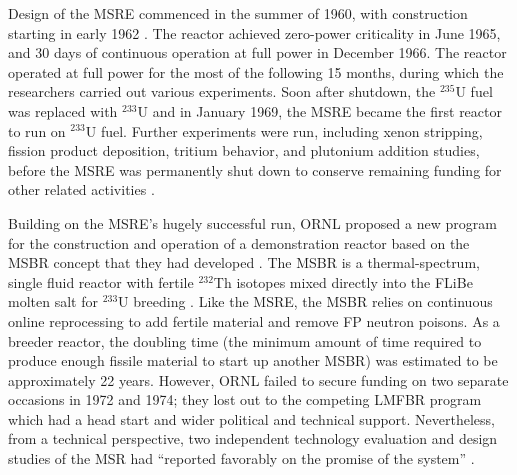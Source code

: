 Design of the \gls{MSRE} commenced in the summer of 1960, with construction
starting in early 1962 \cite{haubenreich_experience_1970}. The reactor
achieved zero-power criticality in June 1965, and 30 days of continuous
operation at full power in December 1966. The reactor operated at full power
for the most of the following 15 months, during which the researchers carried
out various experiments. Soon after shutdown, the $^{235}$U fuel was replaced
with $^{233}$U and in January 1969, the \gls{MSRE} became the first reactor to
run on $^{233}$U fuel. Further experiments were run, including xenon
stripping, fission product deposition, tritium behavior, and plutonium
addition studies, before the \gls{MSRE} was permanently shut down to conserve
remaining funding for other related activities \cite{macpherson_molten_1985}.

Building on the \gls{MSRE}'s hugely successful run, \gls{ORNL} proposed a
new program for the construction and operation of a demonstration reactor
based on the \gls{MSBR} concept that they had developed
\cite{macpherson_molten_1985}. The \gls{MSBR} is a thermal-spectrum, single
fluid reactor with fertile $^{232}$Th isotopes mixed directly into the FLiBe
molten salt for $^{233}$U breeding \cite{gehin_liquid_2016}. Like the
\gls{MSRE}, the \gls{MSBR} relies on continuous online reprocessing to add
fertile material and remove \gls{FP} neutron poisons. As a breeder
reactor, the doubling time (the minimum amount of time required to produce
enough fissile material to start up another \gls{MSBR}) was estimated to be
approximately 22 years. However, \gls{ORNL} failed to secure funding on two
separate occasions in 1972 and 1974; they lost out to the competing
\gls{LMFBR} program which had a head start and wider political and technical
support. Nevertheless, from a technical perspective, two independent
technology evaluation and design studies of the \gls{MSR} had ``reported
favorably on the promise of the system'' \cite{macpherson_molten_1985}.

